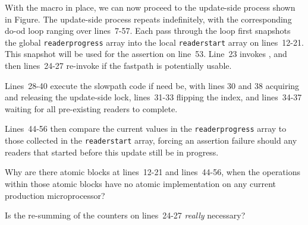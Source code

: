 With the  macro in place, we can now proceed
to the update-side process shown in
Figure.
The update-side process repeats indefinitely, with the corresponding
do-od loop ranging over lines~7-57.
Each pass through the loop first snapshots the global {\tt readerprogress}
array into the local {\tt readerstart} array on lines~12-21.
This snapshot will be used for the assertion on line~53.
Line~23 invokes , and then lines~24-27
re-invoke  if the fastpath is potentially
usable.

Lines~28-40 execute the slowpath code if need be, with
lines 30 and 38 acquiring and releasing the update-side lock,
lines~31-33 flipping the index, and lines~34-37 waiting for
all pre-existing readers to complete.

Lines~44-56 then compare the current values in the {\tt readerprogress}
array to those collected in the {\tt readerstart} array,
forcing an assertion failure should any readers that started before
this update still be in progress.

\QuickQuiz{}
	Why are there atomic blocks at lines~12-21
	and lines~44-56, when the operations within those atomic
	blocks have no atomic implementation on any current
	production microprocessor?
 \QuickQuizEnd

\QuickQuiz{}
	Is the re-summing of the counters on lines~24-27
	\emph{really} necessary?
 \QuickQuizEnd

